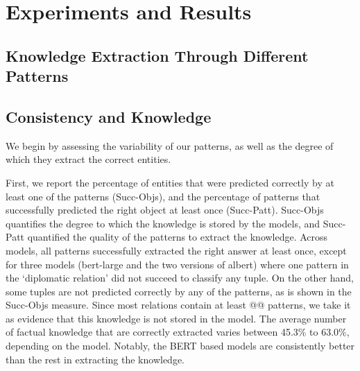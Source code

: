 \section{Experiments and Results}
\label{sec:experiments}






\subsection{Knowledge Extraction Through Different Patterns}


\subsection{Consistency and Knowledge}


We begin by assessing the variability of our patterns, as well as the degree of which they extract the correct entities.

First, we report the percentage of entities that were predicted correctly by at least one of the patterns (Succ-Objs), and the percentage of patterns that successfully predicted the right object at least once (Succ-Patt). Succ-Objs quantifies the degree to which the knowledge is stored by the models, and Succ-Patt quantified the quality of the patterns to extract the knowledge.
Across models, all patterns successfully extracted the right
answer at least once, except for three models (bert-large and the two versions of albert) where one pattern in the `diplomatic relation'  did not succeed to classify any tuple.
On the other hand, some tuples are not predicted correctly by any of the patterns, as is shown in the Succ-Objs measure. Since most relations contain at least @@ patterns, we take it as evidence that this knowledge is not stored in the model. 
The average number of factual knowledge that are correctly extracted varies between 45.3\% to 63.0\%, depending on the model. Notably, the BERT based models are consistently better than the rest in extracting the knowledge. 

